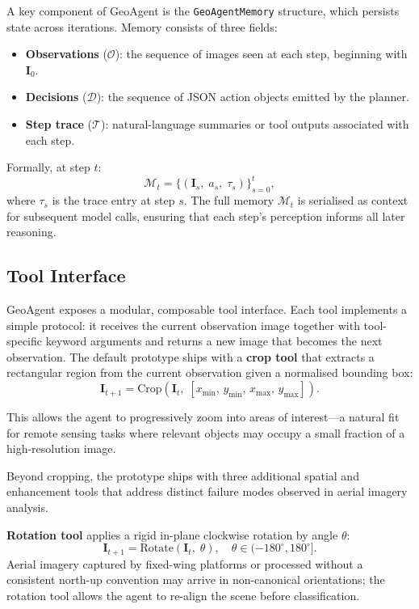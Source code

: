 \documentclass{article}
\begin{document}
A key component of GeoAgent is the \texttt{GeoAgentMemory} structure, which
persists state across iterations.  Memory consists of three fields:

\begin{itemize}
  \item \textbf{Observations} ($\mathcal{O}$): the sequence of images seen at each
    step, beginning with $\mathbf{I}_0$.
  \item \textbf{Decisions} ($\mathcal{D}$): the sequence of JSON action objects
    emitted by the planner.
  \item \textbf{Step trace} ($\mathcal{T}$): natural-language summaries or tool
    outputs associated with each step.
\end{itemize}

Formally, at step $t$:
\begin{equation}
  \mathcal{M}_t = \bigl\{(\mathbf{I}_s,\; a_s,\; \tau_s)\bigr\}_{s=0}^{t},
\end{equation}
where $\tau_s$ is the trace entry at step $s$.  The full memory $\mathcal{M}_t$ is
serialised as context for subsequent model calls, ensuring that each step's
perception informs all later reasoning.

\subsection{Tool Interface}

GeoAgent exposes a modular, composable tool interface.  Each tool implements a
simple protocol: it receives the current observation image together with
tool-specific keyword arguments and returns a new image that becomes the next
observation.  The default prototype ships with a \textbf{crop tool} that extracts a
rectangular region from the current observation given a normalised bounding box:
\begin{equation}
  \mathbf{I}_{t+1} = \mathrm{Crop}\!\left(\mathbf{I}_t,\;
    [x_{\min},\, y_{\min},\, x_{\max},\, y_{\max}]\right).
\end{equation}

This allows the agent to progressively zoom into areas of interest---a natural fit
for remote sensing tasks where relevant objects may occupy a small fraction of a
high-resolution image.

Beyond cropping, the prototype ships with three additional spatial and enhancement
tools that address distinct failure modes observed in aerial imagery analysis.

\textbf{Rotation tool} applies a rigid in-plane clockwise rotation by angle $\theta$:
\begin{equation}
  \mathbf{I}_{t+1} = \mathrm{Rotate}\!\left(\mathbf{I}_t,\;\theta\right),
  \quad \theta \in (-180^{\circ}, 180^{\circ}].
\end{equation}
Aerial imagery captured by fixed-wing platforms or processed without a consistent
north-up convention may arrive in non-canonical orientations; the rotation tool
allows the agent to re-align the scene before classification.
\end{document}
